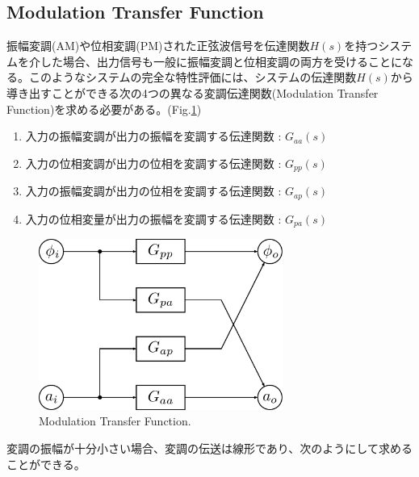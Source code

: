 \documentclass[book]{jlreq}
\begin{document}
\subsection{Modulation Transfer Function}
%
振幅変調(AM)や位相変調(PM)された正弦波信号を伝達関数$H(s)$を持つシステムを介した場合、出力信号も一般に振幅変調と位相変調の両方を受けることになる。このようなシステムの完全な特性評価には、システムの伝達関数$H(s)$から導き出すことができる次の4つの異なる変調伝達関数(Modulation Transfer Function)を求める必要がある。(Fig.\ref{fig:MTF})
%
\begin{enumerate}
    \item 入力の振幅変調が出力の振幅を変調する伝達関数 : $G_{aa}(s)$
    \item 入力の位相変調が出力の位相を変調する伝達関数 : $G_{pp}(s)$
    \item 入力の振幅変調が出力の位相を変調する伝達関数 : $G_{ap}(s)$
    \item 入力の位相変量が出力の振幅を変調する伝達関数 : $G_{pa}(s)$
\end{enumerate}
%
\begin{figure}[hbt]
    \begin{center}
        \includegraphics[width=8cm,clip]{figs/Mod_Trans_Func.pdf}
        \caption{Modulation Transfer Function.}
        \label{fig:MTF}
    \end{center}
\end{figure}
%
変調の振幅が十分小さい場合、変調の伝送は線形であり、次のようにして求めることができる。
\end{document}
